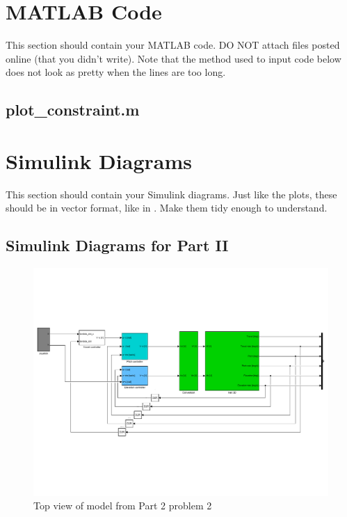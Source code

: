 \appendix

\section{MATLAB Code}\label{sec:matlab}
This section should contain your MATLAB code. DO NOT attach files posted online (that you didn't write). Note that the method used to input code below does not look as pretty when the lines are too long.

\subsection{plot\_constraint.m}\label{sec:plot_constraint_m}
\section{Simulink Diagrams}\label{sec:simulink}
This section should contain your Simulink diagrams. Just like the plots, these should be in vector format, like in . Make them tidy enough to understand.

\subsection{Simulink Diagrams for Part II}
\begin{figure}[!!ht!!!!!!!!tb!!]
    	\centering
		\includegraphics[width=1.1\textwidth,trim={0cm 3cm 0cm 5cm},clip]{figures/simulink/P2p2.pdf}
    	\caption{Top view of model from Part 2 problem 2}
\label{fig:P2p2_simulink}
\end{figure}
\FloatBarrier

